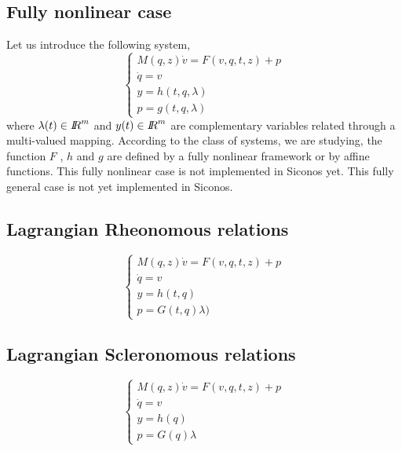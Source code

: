 \subsection{Fully nonlinear case}
Let us introduce the following system,
\begin{equation}
  \label{eq:FullyNonLinear}
  \begin{cases}
    M(q,z) \dot v = F(v, q, t, z) + p  \\
    \dot q = v \\
    y = h(t,q,\lambda) \\
    p = g(t,q,\lambda)
  \end{cases}
\end{equation}
where $\lambda(t) \in \mbox{\rm $I\!\!R$}^m$  and $y(t) \in \mbox{\rm $I\!\!R$}^m$ are  complementary variables related through a multi-valued mapping. According to the class of systems, we are studying, the function $F$ , $h$ and $g$ are defined by a fully nonlinear framework or by affine functions. This fully nonlinear case is not  implemented in Siconos yet. This fully general case is not yet implemented in Siconos.



\subsection{Lagrangian Rheonomous relations}

\begin{equation}
  \label{eq:RheonomousNonLinear}
  \begin{cases}
    M(q,z) \dot v = F(v, q, t, z) + p \\
    \dot q = v \\
    y = h(t,q) \\
    p = G(t,q)\lambda)
  \end{cases}
\end{equation}

\subsection{Lagrangian Scleronomous relations}

\begin{equation}
  \label{eq:ScleronomousNonLinear}
  \begin{cases}
    M(q,z) \dot v  = F(v, q, t, z) + p  \\
    \dot q = v \\
    y = h(q) \\
    p = G(q)\lambda
  \end{cases}
\end{equation}



